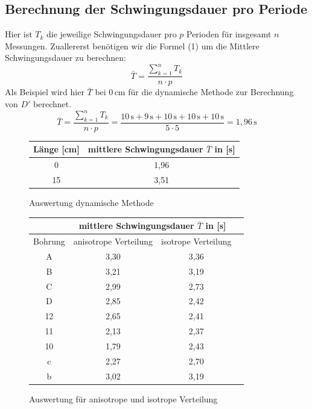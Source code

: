 \documentclass[fontsize=12pt]{scrartcl}
\begin{document}
\subsection{Berechnung der Schwingungsdauer pro Periode}
Hier ist $T_k$ die jeweilige Schwingungsdauer pro $p$ Perioden für insgesamt $n$ Messungen.
Zuallererst benötigen wir die Formel (1) um die Mittlere Schwingungsdauer zu berechnen:
\begin{equation*}
\bar{T}= \frac{\sum\limits_{k=1}^n T_k}{n \cdot p}
\end{equation*}
Als Beispiel wird hier $\bar{T}$ bei $0\,\text{cm}$ für die dynamische Methode zur Berechnung von $D'$ berechnet.
\begin{equation*}
\bar{T}= \frac{\sum\limits_{k=1}^n T_k}{n \cdot p}= \frac{10\,\text{s} + 9\,\text{s} + 10\,\text{s} + 10\,\text{s} + 10\,\text{s}}{5 \cdot 5}=1,96\,\text{s}
\end{equation*}
\begin{figure}[h!]
\vspace{-10pt}
\centering
\caption{Auswertung dynamische Methode}
\begin{tabular}{|c|c|} \hline
\rule{0pt}{12,5pt}Länge [cm] &mittlere Schwingungsdauer $\bar{T}$ in [s]	\\ \hline
0		&1,96	\\ \hline
15	&3,51	\\ \hline
\end{tabular}
\end{figure}
\begin{figure}[h!]
\vspace{-10pt}
\centering
\caption{Auswertung  für anisotrope und isotrope Verteilung}
\begin{tabular}{|c|c|c|c|} \hline
\rule{0pt}{12,5pt}&\multicolumn{2}{c|}{mittlere Schwingungsdauer $\bar{T}$ in [s]}\\ \hline
Bohrung & anisotrope Verteilung & isotrope Verteilung\\ \hline
A		&	3,30&3,36	\\ \hline
B		&3,21&3,19	\\ \hline
C		&2,99&2,73	\\ \hline
D		&2,85&2,42	\\ \hline
12	&2,65&2,41	\\ \hline
11		&2,13&2,37	\\ \hline
10	&1,79&2,43	\\ \hline
 c		&2,27&2,70	\\ \hline
 b		&3,02&3,19	\\ \hline
\end{tabular}
\end{figure}
\end{document}
